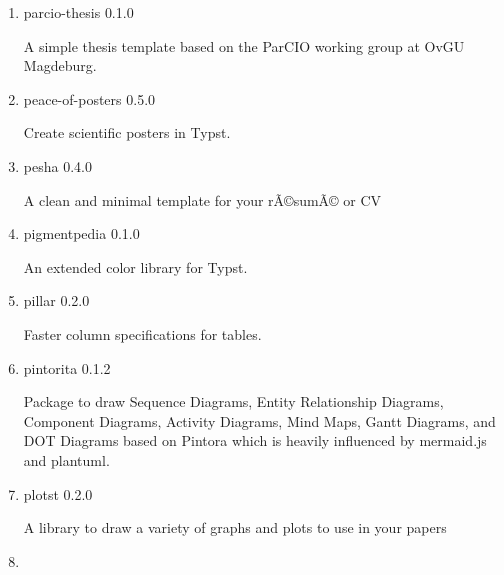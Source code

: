 \begin{enumerate}
  { paddling-tongji-thesis } { 0.1.1 }

  å?ŒæµŽå¤§å­¦æœ¬ç§`ç''Ÿæ¯•ä¸šè®¾è®¡è®ºæ--‡æ¨¡æ?¿ \textbar{} Tongji
  University Undergraduate Thesis Template
\item
  \href{/universe/package/parcio-thesis/}{}


  { parcio-thesis } { 0.1.0 }

  A simple thesis template based on the ParCIO working group at OvGU
  Magdeburg.
\item
  \href{/universe/package/peace-of-posters/}{}


  { peace-of-posters } { 0.5.0 }

  Create scientific posters in Typst.
\item
  \href{/universe/package/pesha/}{}


  { pesha } { 0.4.0 }

  A clean and minimal template for your rÃ©sumÃ© or CV
\item
  \href{/universe/package/pigmentpedia/}{}

  { pigmentpedia } { 0.1.0 }

  An extended color library for Typst.
\item
  \href{/universe/package/pillar/}{}

  { pillar } { 0.2.0 }

  Faster column specifications for tables.
\item
  \href{/universe/package/pintorita/}{}

  { pintorita } { 0.1.2 }

  Package to draw Sequence Diagrams, Entity Relationship Diagrams,
  Component Diagrams, Activity Diagrams, Mind Maps, Gantt Diagrams, and
  DOT Diagrams based on Pintora which is heavily influenced by
  mermaid.js and plantuml.
\item
  \href{/universe/package/plotst/}{}

  { plotst } { 0.2.0 }

  A library to draw a variety of graphs and plots to use in your papers
\item
  \href{/universe/package/pointless-size/}{}


\end{enumerate}
